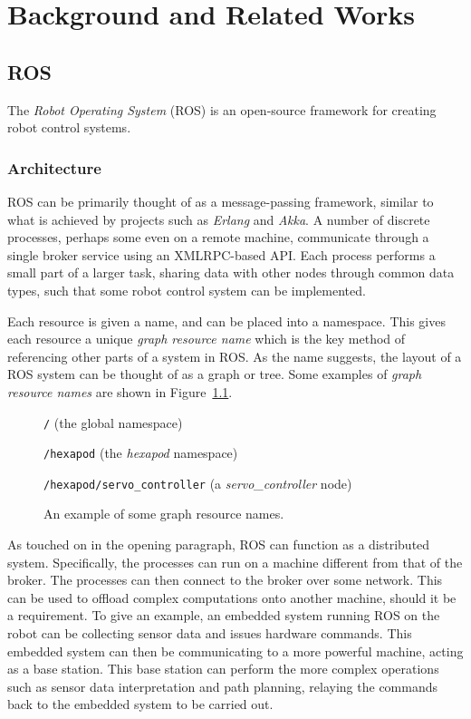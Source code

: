 \chapter{Background and Related Works}


\section{ROS}

The \emph{Robot Operating System} (ROS) \cite{ros_site} is an open-source framework for creating robot control systems.

\subsection{Architecture}
ROS can be primarily thought of as a message-passing framework, similar to what is achieved by projects such as \emph{Erlang} \cite{erlang} and \emph{Akka}. A number of discrete processes, perhaps some even on a remote machine, communicate through a single broker service using an XMLRPC-based API. Each process performs a small part of a larger task, sharing data with other nodes through common data types, such that some robot control system can be implemented.

Each resource is given a name, and can be placed into a namespace. This gives each resource a unique \emph{graph resource name} which is the key method of referencing other parts of a system in ROS. As the name suggests, the layout of a ROS system can be thought of as a graph or tree. Some examples of \emph{graph resource names} are shown in Figure~\ref{fig:graph_resource_names}.

\begin{figure}[h!]
    \centering

    \texttt{/} (the global namespace)

    \texttt{/hexapod} (the \emph{hexapod} namespace)

    \texttt{/hexapod/servo\_controller} (a \emph{servo\_controller} node)

    \caption{An example of some graph resource names.}
    \label{fig:graph_resource_names}
\end{figure}

As touched on in the opening paragraph, ROS can function as a distributed system. Specifically, the processes can run on a machine different from that of the broker. The processes can then connect to the broker over some network. This can be used to offload complex computations onto another machine, should it be a requirement. To give an example, an embedded system running ROS on the robot can be collecting sensor data and issues hardware commands. This embedded system can then be communicating to a more powerful machine, acting as a base station. This base station can perform the more complex operations such as sensor data interpretation and path planning, relaying the commands back to the embedded system to be carried out.

